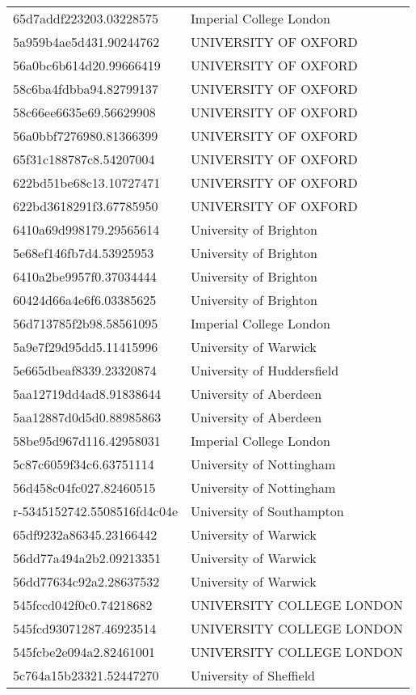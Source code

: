 \begin{tabular}{ll}
65d7addf223203.03228575 & Imperial College London \\
5a959b4ae5d431.90244762 & UNIVERSITY OF OXFORD \\
56a0bc6b614d20.99666419 & UNIVERSITY OF OXFORD \\
58c6ba4fdbba94.82799137 & UNIVERSITY OF OXFORD \\
58c66ee6635e69.56629908 & UNIVERSITY OF OXFORD \\
56a0bbf7276980.81366399 & UNIVERSITY OF OXFORD \\
65f31c188787c8.54207004 & UNIVERSITY OF OXFORD \\
622bd51be68c13.10727471 & UNIVERSITY OF OXFORD \\
622bd3618291f3.67785950 & UNIVERSITY OF OXFORD \\
6410a69d998179.29565614 & University of Brighton \\
5e68ef146fb7d4.53925953 & University of Brighton \\
6410a2be9957f0.37034444 & University of Brighton \\
60424d66a4e6f6.03385625 & University of Brighton \\
56d713785f2b98.58561095 & Imperial College London \\
5a9e7f29d95dd5.11415996 & University of Warwick \\
5e665dbeaf8339.23320874 & University of Huddersfield \\
5aa12719dd4ad8.91838644 & University of Aberdeen \\
5aa12887d0d5d0.88985863 & University of Aberdeen \\
58be95d967d116.42958031 & Imperial College London \\
5c87c6059f34c6.63751114 & University of Nottingham \\
56d458c04fc027.82460515 & University of Nottingham \\
r-5345152742.5508516fd4c04e & University of Southampton \\
65df9232a86345.23166442 & University of Warwick \\
56dd77a494a2b2.09213351 & University of Warwick \\
56dd77634c92a2.28637532 & University of Warwick \\
545fccd042f0c0.74218682 & UNIVERSITY COLLEGE LONDON \\
545fcd93071287.46923514 & UNIVERSITY COLLEGE LONDON \\
545fcbe2e094a2.82461001 & UNIVERSITY COLLEGE LONDON \\
5c764a15b23321.52447270 & University of Sheffield \\

\end{tabular}
